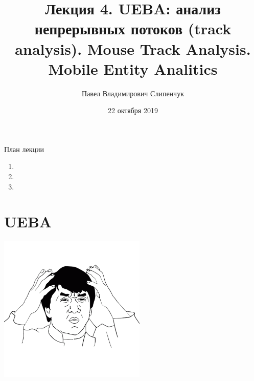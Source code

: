


\title{Лекция 4. UEBA: анализ непрерывных потоков (track analysis). Mouse Track Analysis. Mobile Entity Analitics}

\date{22 октября 2019}
\author{Павел Владимирович Слипенчук}



  \maketitle
    
\begin{frame}{План лекции}
    \begin{enumerate}
    	\item {}
    	\item {}
		\item {}
	\end{enumerate}
\end{frame}

\section{UEBA}\label{section:ueba}
	\begin{center}
		\includegraphics[width=7cm]{../pic/Jackie_Chan.png}
		
		\LARGE
	\end{center}

